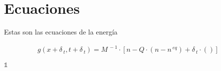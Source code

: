 \chapter{Ecuaciones}\label{ecu}


Estas son las ecuaciones de la energía

\begin{align}
    g(x+ \delta_{\>t}, t +\delta_{\>t}) = M^{\>-1} \cdot \left[ n - Q \cdot \left( n - n^{\>eq}\right) + \delta_{\>t} \cdot \left( \right) \right]
\end{align}

\noindent
\(\mathds{1}\)